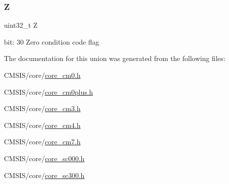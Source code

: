 \subsubsection{\texorpdfstring{Z}{Z}}
{\footnotesize\ttfamily uint32\+\_\+t Z}

bit\+: 30 Zero condition code flag 

The documentation for this union was generated from the following files\+:\begin{DoxyCompactItemize}
\item 
C\+M\+S\+I\+S/core/\hyperlink{core__cm0_8h}{core\+\_\+cm0.\+h}\item 
C\+M\+S\+I\+S/core/\hyperlink{core__cm0plus_8h}{core\+\_\+cm0plus.\+h}\item 
C\+M\+S\+I\+S/core/\hyperlink{core__cm3_8h}{core\+\_\+cm3.\+h}\item 
C\+M\+S\+I\+S/core/\hyperlink{core__cm4_8h}{core\+\_\+cm4.\+h}\item 
C\+M\+S\+I\+S/core/\hyperlink{core__cm7_8h}{core\+\_\+cm7.\+h}\item 
C\+M\+S\+I\+S/core/\hyperlink{core__sc000_8h}{core\+\_\+sc000.\+h}\item 
C\+M\+S\+I\+S/core/\hyperlink{core__sc300_8h}{core\+\_\+sc300.\+h}\end{DoxyCompactItemize}
